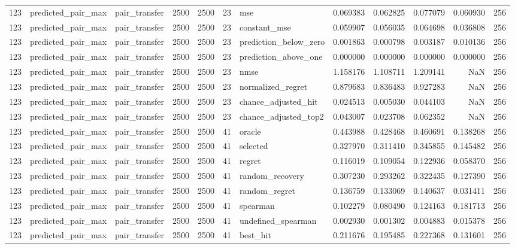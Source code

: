 \begin{tabular}{rllrrrlrrrrr}
123 & predicted_pair_max & pair_transfer & 2500 & 2500 & 23 & mse & 0.069383 & 0.062825 & 0.077079 & 0.060930 & 256 \\
123 & predicted_pair_max & pair_transfer & 2500 & 2500 & 23 & constant_mse & 0.059907 & 0.056035 & 0.064698 & 0.036808 & 256 \\
123 & predicted_pair_max & pair_transfer & 2500 & 2500 & 23 & prediction_below_zero & 0.001863 & 0.000798 & 0.003187 & 0.010136 & 256 \\
123 & predicted_pair_max & pair_transfer & 2500 & 2500 & 23 & prediction_above_one & 0.000000 & 0.000000 & 0.000000 & 0.000000 & 256 \\
123 & predicted_pair_max & pair_transfer & 2500 & 2500 & 23 & nmse & 1.158176 & 1.108711 & 1.209141 & NaN & 256 \\
123 & predicted_pair_max & pair_transfer & 2500 & 2500 & 23 & normalized_regret & 0.879683 & 0.836483 & 0.927283 & NaN & 256 \\
123 & predicted_pair_max & pair_transfer & 2500 & 2500 & 23 & chance_adjusted_hit & 0.024513 & 0.005030 & 0.044103 & NaN & 256 \\
123 & predicted_pair_max & pair_transfer & 2500 & 2500 & 23 & chance_adjusted_top2 & 0.043007 & 0.023708 & 0.062352 & NaN & 256 \\
123 & predicted_pair_max & pair_transfer & 2500 & 2500 & 41 & oracle & 0.443988 & 0.428468 & 0.460691 & 0.138268 & 256 \\
123 & predicted_pair_max & pair_transfer & 2500 & 2500 & 41 & selected & 0.327970 & 0.311410 & 0.345855 & 0.145482 & 256 \\
123 & predicted_pair_max & pair_transfer & 2500 & 2500 & 41 & regret & 0.116019 & 0.109054 & 0.122936 & 0.058370 & 256 \\
123 & predicted_pair_max & pair_transfer & 2500 & 2500 & 41 & random_recovery & 0.307230 & 0.293262 & 0.322435 & 0.127390 & 256 \\
123 & predicted_pair_max & pair_transfer & 2500 & 2500 & 41 & random_regret & 0.136759 & 0.133069 & 0.140637 & 0.031411 & 256 \\
123 & predicted_pair_max & pair_transfer & 2500 & 2500 & 41 & spearman & 0.102279 & 0.080490 & 0.124163 & 0.181713 & 256 \\
123 & predicted_pair_max & pair_transfer & 2500 & 2500 & 41 & undefined_spearman & 0.002930 & 0.001302 & 0.004883 & 0.015378 & 256 \\
123 & predicted_pair_max & pair_transfer & 2500 & 2500 & 41 & best_hit & 0.211676 & 0.195485 & 0.227368 & 0.131601 & 256 \\

\end{tabular}
